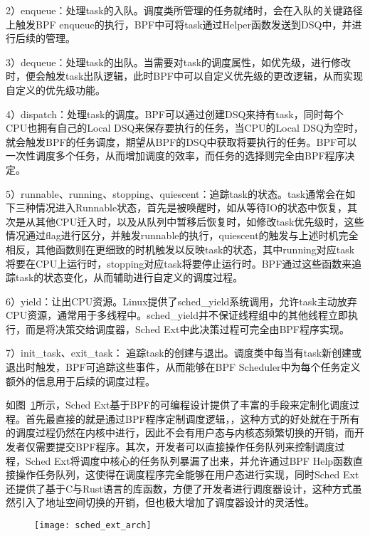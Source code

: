 2）enqueue：处理task的入队。调度类所管理的任务就绪时，会在入队的关键路径上触发BPF enqueue的执行，BPF中可将task通过Helper函数发送到DSQ中，并进行后续的管理。

3）dequeue：处理task的出队。当需要对task的调度属性，如优先级，进行修改时，便会触发task出队逻辑，此时BPF中可以自定义优先级的更改逻辑，从而实现自定义的优先级功能。

4）dispatch：处理task的调度。BPF可以通过创建DSQ来持有task，同时每个CPU也拥有自己的Local DSQ来保存要执行的任务，当CPU的Local DSQ为空时，就会触发BPF的任务调度，期望从BPF的DSQ中获取将要执行的任务。BPF可以一次性调度多个任务，从而增加调度的效率，而任务的选择则完全由BPF程序决定。

5）runnable、running、stopping、quiescent：追踪task的状态。task通常会在如下三种情况进入Runnable状态，首先是被唤醒时，如从等待IO的状态中恢复，其次是从其他CPU迁入时，以及从队列中暂移后恢复时，如修改task优先级时，这些情况通过flag进行区分，并触发runnable的执行，quiescent的触发与上述时机完全相反，其他函数则在更细致的时机触发以反映task的状态，其中running对应task将要在CPU上运行时，stopping对应task将要停止运行时。BPF通过这些函数来追踪task的状态变化，从而辅助进行自定义的调度过程。

6）yield：让出CPU资源。Linux提供了sched_yield系统调用，允许task主动放弃CPU资源，通常用于多线程中。sched_yield并不保证线程组中的其他线程立即执行，而是将决策交给调度器，Sched Ext中此决策过程可完全由BPF程序实现。

7）init_task、exit_task： 追踪task的创建与退出。调度类中每当有task新创建或退出时触发，BPF可追踪这些事件，从而能够在BPF Scheduler中为每个任务定义额外的信息用于后续的调度过程。

如图~\ref{fig:sched_ext_arch}所示，Sched Ext基于BPF的可编程设计提供了丰富的手段来定制化调度过程。首先最直接的就是通过BPF程序定制调度逻辑，，这种方式的好处就在于所有的调度过程仍然在内核中进行，因此不会有用户态与内核态频繁切换的开销，而开发者仅需要提交BPF程序。其次，开发者可以直接操作任务队列来控制调度过程，Sched Ext将调度中核心的任务队列暴漏了出来，并允许通过BPF Help函数直接操作任务队列，这使得在调度程序完全能够在用户态进行实现，同时Sched Ext还提供了基于C与Rust语言的库函数，方便了开发者进行调度器设计，这种方式虽然引入了地址空间切换的开销，但也极大增加了调度器设计的灵活性。

\begin{figure}[!htbp]
    \centering
    \texttt{[image: sched\_ext\_arch]}
    \label{fig:sched_ext_arch}
\end{figure}

